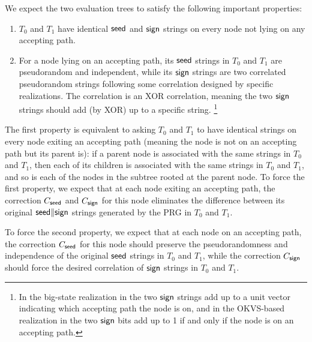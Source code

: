 We expect the two evaluation trees to satisfy the following important properties: 
\begin{enumerate}
  \item\label{enu:tree_invariance_1} $T_0$ and $T_1$ have identical ${\sf seed}$ and ${\sf sign}$ strings on every node not lying on any accepting path.
  \item\label{enu:tree_invariance_2} For a node lying on an accepting path, its ${\sf seed}$ strings in $T_0$ and $T_1$ are pseudorandom and independent, while its ${\sf sign}$ strings are two correlated pseudorandom strings following some  correlation designed by specific realizations. The correlation is an XOR correlation, meaning the two ${\sf sign}$ strings should add (by XOR) up to a specific string. %
  \footnote{In the big-state realization in  the two ${\sf sign}$ strings add up to a unit vector indicating which accepting path the node is on, and in the OKVS-based realization in  the two ${\sf sign}$ bits add up to 1 if and only if the node is on an accepting path. }
\end{enumerate}  
The first property is equivalent to asking $T_0$ and $T_1$ to have identical strings on every node exiting an accepting path (meaning the node is not on an accepting path but its parent is): if a parent node is associated with the same strings in $T_0$ and $T_1$, then each of its children is associated with the same strings in $T_0$ and $T_1$, and so is each of the nodes in the subtree rooted at the parent node. 
To force the first property, we expect that at each node exiting an accepting path, the correction $C_{\sf seed}$ and $C_{\sf sign}$ for this node eliminates the difference between its original ${\sf seed}\|{\sf sign}$ strings generated by the PRG in $T_0$ and $T_1$. 

To force the second property, we expect that at each node on an accepting path, the correction $C_{\sf seed}$ for this node should preserve the pseudorandomness and independence of the original ${\sf seed}$ strings in $T_0$ and $T_1$, while the correction $C_{\sf sign}$ should force the desired correlation of ${\sf sign}$ strings in $T_0$ and $T_1$. 

